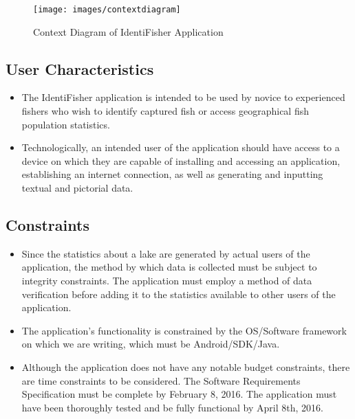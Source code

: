 \documentclass{article}
\begin{document}
\begin{figure}[H]
	\texttt{[image: images/contextdiagram]}
	\caption{Context Diagram of IdentiFisher Application}
\end{figure}


\subsection{User Characteristics}
\begin{itemize}
	\item
	The IdentiFisher application is intended to be used by novice to experienced fishers who wish to identify captured fish or access geographical fish population statistics.

	\item
	Technologically, an intended user of the application should have access to a device on which they are capable of installing and accessing an application, establishing an internet connection, as well as generating and inputting textual and pictorial data.
\end{itemize}

\subsection{Constraints}
\begin{itemize}
	\item
	Since the statistics about a lake are generated by actual users of the application, the method by which data is collected must be subject to integrity constraints. The application must employ a method of data verification before adding it to the statistics available to other users of the application.

	\item
	The application's functionality is constrained by the OS/Software framework on which we are writing, which must be Android/SDK/Java.

	\item
	Although the application does not have any notable budget constraints, there are time constraints to be considered. The Software Requirements Specification must be complete by February 8, 2016. The application must have been thoroughly tested and be fully functional by April 8th, 2016.
\end{itemize}
\end{document}
